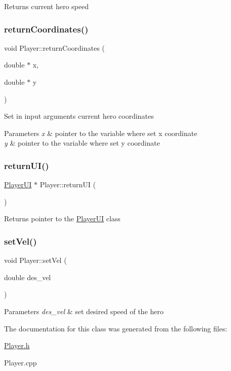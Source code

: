 \begin{DoxyReturn}{Returns}
current hero speed 
\end{DoxyReturn}
\mbox{\label{class_player_ab3d8dc6872a9903ea2717b57d77790a3}} 
\subsubsection{\texorpdfstring{return\+Coordinates()}{returnCoordinates()}}
{\footnotesize\ttfamily void Player\+::return\+Coordinates (\begin{DoxyParamCaption}\item[{double $\ast$}]{x,  }\item[{double $\ast$}]{y }\end{DoxyParamCaption})}

Set in input arguments current hero coordinates 
\begin{DoxyParams}{Parameters}
{\em x} & pointer to the variable where set x coordinate \\
\hline
{\em y} & pointer to the variable where set y coordinate \\
\hline
\end{DoxyParams}
\mbox{\label{class_player_aefa23e8642f25b0f7e72543599d567f6}} 
\subsubsection{\texorpdfstring{return\+U\+I()}{returnUI()}}
{\footnotesize\ttfamily \hyperlink{class_player_u_i}{Player\+UI} $\ast$ Player\+::return\+UI (\begin{DoxyParamCaption}{ }\end{DoxyParamCaption})}

\begin{DoxyReturn}{Returns}
pointer to the \hyperlink{class_player_u_i}{Player\+UI} class 
\end{DoxyReturn}
\mbox{\label{class_player_ade0e4463e66975e549986ce55cac9467}} 
\subsubsection{\texorpdfstring{set\+Vel()}{setVel()}}
{\footnotesize\ttfamily void Player\+::set\+Vel (\begin{DoxyParamCaption}\item[{double}]{des\+\_\+vel }\end{DoxyParamCaption})}


\begin{DoxyParams}{Parameters}
{\em des\+\_\+vel} & set desired speed of the hero \\
\hline
\end{DoxyParams}


The documentation for this class was generated from the following files\+:\begin{DoxyCompactItemize}
\item 
\hyperlink{_player_8h}{Player.\+h}\item 
Player.\+cpp\end{DoxyCompactItemize}
